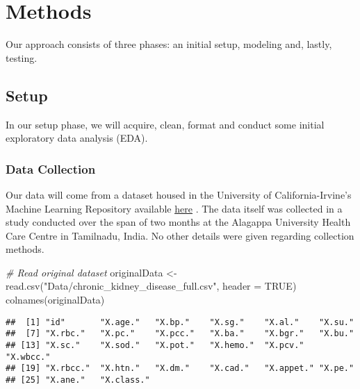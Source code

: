 \documentclass[
]{article}
\newenvironment{Shaded}{\begin{snugshade}}{\end{snugshade}}
\newcommand{\AttributeTok}[1]{\textcolor[rgb]{0.77,0.63,0.00}{#1}}
\newcommand{\CommentTok}[1]{\textcolor[rgb]{0.56,0.35,0.01}{\textit{#1}}}
\newcommand{\ConstantTok}[1]{\textcolor[rgb]{0.00,0.00,0.00}{#1}}
\newcommand{\FunctionTok}[1]{\textcolor[rgb]{0.00,0.00,0.00}{#1}}
\newcommand{\NormalTok}[1]{#1}
\newcommand{\OtherTok}[1]{\textcolor[rgb]{0.56,0.35,0.01}{#1}}
\newcommand{\StringTok}[1]{\textcolor[rgb]{0.31,0.60,0.02}{#1}}
\begin{document}
\hypertarget{methods}{%
\section{Methods}\label{methods}}

Our approach consists of three phases: an initial setup, modeling and,
lastly, testing.

\hypertarget{setup}{%
\subsection{Setup}\label{setup}}

In our setup phase, we will acquire, clean, format and conduct some
initial exploratory data analysis (EDA).

\hypertarget{data-collection}{%
\subsubsection{Data Collection}\label{data-collection}}

Our data will come from a dataset housed in the University of
California-Irvine's Machine Learning Repository available
\href{https://archive.ics.uci.edu/ml/machine-learning-databases/00336/Chronic_Kidney_Disease.rar}{\underline{here}}
\autocite{Dua2019}. The data itself was collected in a study conducted
over the span of two months at the Alagappa University Health Care
Centre in Tamilnadu, India. No other details were given regarding
collection methods.

\begin{Shaded}
\begin{Highlighting}[]
\CommentTok{\# Read original dataset}
\NormalTok{originalData }\OtherTok{\textless{}{-}} \FunctionTok{read.csv}\NormalTok{(}\StringTok{"Data/chronic\_kidney\_disease\_full.csv"}\NormalTok{, }\AttributeTok{header =} \ConstantTok{TRUE}\NormalTok{)}
\FunctionTok{colnames}\NormalTok{(originalData)}
\end{Highlighting}
\end{Shaded}

\begin{verbatim}
##  [1] "id"       "X.age."   "X.bp."    "X.sg."    "X.al."    "X.su."   
##  [7] "X.rbc."   "X.pc."    "X.pcc."   "X.ba."    "X.bgr."   "X.bu."   
## [13] "X.sc."    "X.sod."   "X.pot."   "X.hemo."  "X.pcv."   "X.wbcc." 
## [19] "X.rbcc."  "X.htn."   "X.dm."    "X.cad."   "X.appet." "X.pe."   
## [25] "X.ane."   "X.class."
\end{verbatim}
\end{document}
